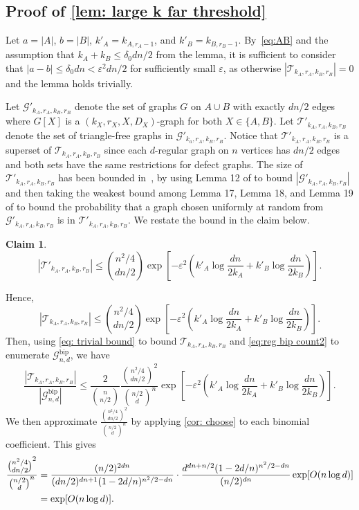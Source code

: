 \documentclass[11pt]{article}
\theoremstyle{plain}
\newtheorem{claim}{Claim}[thm]
\begin{document}
\subsection{Proof of \cref{lem: large k far threshold}}
Let $a=|A| $, $b=|B| $, $k'_A = k_{A, r_A - 1}$, and $k'_B=k_{B, r_B - 1}$. 
    By~\eqref{eq:AB} and the assumption that $k_A + k_B \leq \delta_0dn/2$ from the lemma, it is sufficient to consider that $|a-b| \leq \delta_0dn < \varepsilon^2dn/2$ for sufficiently small $\varepsilon$, as otherwise $|\mathcal T_{k_A, r_A, k_B, r_B}|=0$ and the lemma holds trivially. 
    
Let $\mathcal G'_{k_A, r_A, k_B, r_B}$ denote the set of graphs $G$ on $A \cup B$ with exactly $dn/2$ edges where $G[X]$ is a $(k_X, r_X, X, D_{X})$-graph for both $X \in \{A, B\}$. Let $\mathcal T'_{k_A, r_A, k_B, r_B}$ denote the set of triangle-free graphs in $\mathcal G'_{k_a, r_A, k_B, r_B}$. Notice that $\mathcal T'_{k_A, r_A, k_B, r_B}$ is a superset of $\mathcal T_{k_A, r_A, k_B, r_B}$ since each $d$-regular graph on $n$ vertices has $dn/2$ edges and both sets have the same restrictions for defect graphs. The size of $\mathcal T'_{k_A, r_A, k_B, r_B}$ has been bounded in~\cite{osthus2003densities}, by using Lemma 12 of \cite{osthus2003densities} to bound $|\mathcal G'_{k_A, r_A, k_B, r_B}|$ and then taking the weakest bound among Lemma 17, Lemma 18, and Lemma 19 of \cite{osthus2003densities} to bound the probability that a graph chosen uniformly at random from $\mathcal G'_{k_A, r_A, k_B, r_B}$ is in $\mathcal T'_{k_A, r_A, k_B, r_B}$. We restate the bound in the claim below.  




\begin{claim}\label{clm: no degree constraints}\cite{osthus2003densities} 
     \[
     |\mathcal T'_{ k_A, r_A,k_B, r_B}| \leq \binom{n^2/4}{dn/2}\exp\left[-\varepsilon^2\left(k'_A\log \frac{dn}{2k_A} + k'_B\log\frac{dn}{2k_B}\right)\right].
     \]
\end{claim}
Hence,
    \begin{equation}\label{eq: trivial bound}
        |\mathcal T_{k_A, r_A, k_B, r_B}| \leq \binom{n^2/4}{dn/2}\exp\left[-\varepsilon^{2}\left(k'_A\log\frac{dn}{2k_A} + k'_B \log\frac{dn}{2k_B}\right)\right].
   \end{equation}
    Then, using \eqref{eq: trivial bound} to bound $\mathcal T_{k_A, r_A, k_B, r_B}$ and  \eqref{eq:reg bip count2} to enumerate $\mathcal G_{n,d}^\text{bip}$, we have
    \[
    \frac{|\mathcal T_{k_A, r_A, k_B, r_B}|}{|\mathcal G_{n,d}^{\text{bip}}|} \leq \frac{2}{\binom{n}{n/2}}\frac{\binom{n^2/4}{dn/2}^2}{\binom{n/2}{d}^{n}}\exp\left[-\varepsilon^{2}\left(k'_A\log\frac{dn}{2k_A} + k'_B \log\frac{dn}{2k_B}\right)\right].
    \]
    We then approximate $\frac{\binom{n^2/4}{dn/2}^2}{\binom{n/2}{d}^{n}}$ by applying \cref{cor: choose} to each binomial coefficient. This gives 
    \begin{align}
        \frac{\binom{n^2/4}{dn/2}^2}{\binom{n/2}{d}^{n}} &= \frac{(n/2)^{2dn}}{(dn/2)^{dn + 1}(1 - 2d/n)^{n^2/2 - dn}} \cdot \frac{d^{dn + n/2}(1 - 2d/n)^{n^2/2 - dn}}{(n/2)^{dn}}\exp[O(n\log d)]\notag\\
        &=\exp[O(n\log d)].\notag
    \end{align}
    
\end{document}
